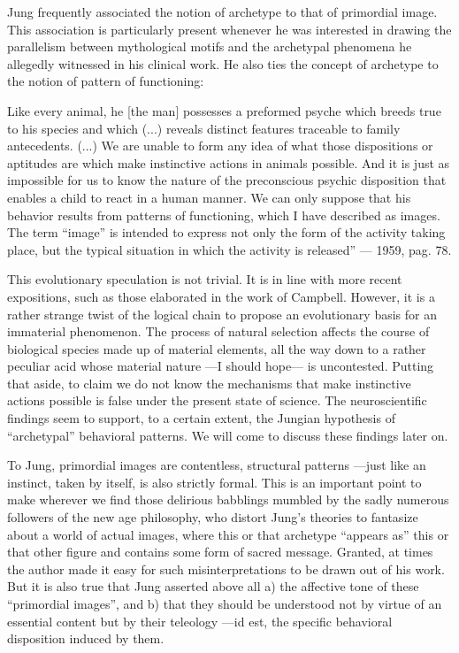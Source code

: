 \documentclass[a4paper]{article}
\begin{document}
    Jung frequently associated
    the notion of archetype to that of primordial image. This association is
    particularly present whenever he was interested in drawing the parallelism
    between mythological motifs and the archetypal phenomena he allegedly
    witnessed in his clinical work. He also ties the concept of archetype to the
    notion of pattern of functioning: 

    Like every animal, he [the man] possesses
    a preformed psyche which breeds true to his species and which (...) reveals
    distinct features traceable to family antecedents. (...) We are unable to
    form any idea of what those dispositions or aptitudes are which make
    instinctive actions in animals possible. And it is just as impossible for us
    to know the nature of the preconscious psychic disposition that enables a
    child to react in a human manner. We can only suppose that his behavior
    results from patterns of functioning, which I have described as images. The
    term “image” is intended to express not only the form of the activity taking
    place, but the typical situation in which the activity is released” — 1959,
    pag. 78. 

    This evolutionary speculation is not trivial. It is in line with
    more recent expositions, such as those elaborated in the work of Campbell.
    However, it is a rather strange twist of the logical chain to propose an
    evolutionary basis for an immaterial phenomenon. The process of natural
    selection affects the course of biological species made up of material
    elements, all the way down to a rather peculiar acid whose material nature
    —I should hope— is uncontested. Putting that aside, to claim we do not know
    the mechanisms that make instinctive actions possible is false under the
    present state of science. The neuroscientific findings seem to support, to a
    certain extent, the Jungian hypothesis of “archetypal” behavioral patterns.
    We will come to discuss these findings later on. 

    To Jung, primordial images
    are contentless, structural patterns —just like an instinct, taken by
    itself, is also strictly formal. This is an important point to make wherever
    we find those delirious babblings mumbled by the sadly numerous followers of
    the new age philosophy, who distort Jung's theories to fantasize about a
    world of actual images, where this or that archetype “appears as” this or
    that other figure and contains some form of sacred message. Granted, at
    times the author made it easy for such misinterpretations to be drawn out of
    his work. But it is also true that Jung asserted above all a) the affective
    tone of these “primordial images”, and b) that they should be understood not
    by virtue of an essential content but by their teleology —id est, the
    specific behavioral disposition induced by them. 
\end{document}
